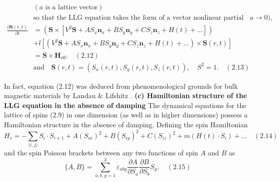 \documentclass{article}
\begin{document}
\begin{align}
	&(a \text{ is a lattice vector}) \nonumber \\
	&\text{so that the LLG equation takes the form of a vector nonlinear partial differential equation (as } a \rightarrow 0), \nonumber \\
	\frac{\partial \mathbf{S}(r, t)}{\partial t} &= \left( \mathbf{S} \times \left[ V^2\mathbf{S} + AS_x \mathbf{n}_x + BS_y \mathbf{n}_y + CS_z \mathbf{n}_z + H(t) + \ldots \right] \right) \nonumber \\
	&+ l \left[ \left( V^2\mathbf{S} + AS_x \mathbf{n}_x + BS_y \mathbf{n}_y + CS_z \mathbf{n}_z + H(t) + \ldots \right) \times \mathbf{S}(r, t) \right] \nonumber \\
	&= \mathbf{S} \times \mathbf{H}_{\text{eff}}. \quad (2.12) \nonumber \\
	&\text{and} \quad \mathbf{S}(r, t) = (S_x(r, t), S_y(r, t), S_z(r, t)), \quad S^2 = 1. \quad (2.13) \nonumber
	\end{align}
	
	In fact, equation (2.12) was deduced from phenomenological grounds for bulk magnetic materials by Landau \& Lifshitz \cite{landau}.
	\textbf{(c) Hamiltonian structure of the LLG equation in the absence of damping}
	The dynamical equations for the lattice of spins (2.9) in one dimension (as well as in higher dimensions) possess a Hamiltonian structure in the absence of damping.
	Defining the spin Hamiltonian
	\begin{equation}
	H_s = - \sum_{\langle i,j \rangle} S_i \cdot S_{i+1} + A(S_{ix})^2 + B(S_{iy})^2 + C(S_{iz})^2 + m(H(t) \cdot S_i) + \ldots \quad (2.14)
	\end{equation}
	and the spin Poisson brackets between any two functions of spin $A$ and $B$ as
	\begin{equation}
	\{A, B\} = \sum_{a,b,g=1}^3 \varepsilon_{abg} \frac{\partial A}{\partial S_a} \frac{\partial B}{\partial S_b} S_g, \quad (2.15)
	\end{equation}
	
\end{document}
